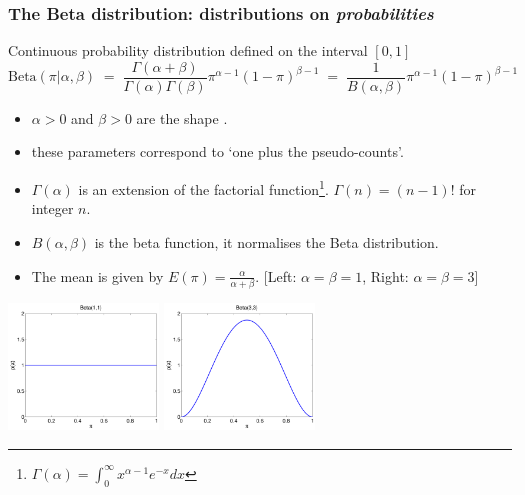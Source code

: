 \begin{frame}
\frametitle{The Beta distribution: distributions on \emph{probabilities}}

Continuous probability distribution defined on the interval
$[0,1]$
\[
\mathrm{Beta}(\pi|\alpha,\beta)\;=\;
\frac{\Gamma(\alpha+\beta)}{\Gamma(\alpha)\Gamma(\beta)}
\pi^{\alpha-1}(1-\pi)^{\beta-1}
\;=\;\frac{1}{B(\alpha,\beta)}\pi^{\alpha-1}(1-\pi)^{\beta-1}
\]
\vspace{-4mm}
\begin{itemize}
\item $\alpha>0$ and $\beta>0$ are the shape .
\item these parameters correspond to `one plus the pseudo-counts'.  
\item $\Gamma(\alpha)$ is an extension of the factorial function\footnote{$\Gamma(\alpha)
  =\int_0^\infty x^{\alpha-1} e^{-x} dx$}. 
$\Gamma(n)=(n-1)!$ for integer $n$.
\item $B(\alpha,\beta)$ is the beta function, it normalises the Beta distribution.
\item The mean is given by $E(\pi)=\frac{\alpha}{\alpha+\beta}$.\hfill
[Left: $\alpha=\beta=1$, Right:  $\alpha=\beta=3$]
\end{itemize}

\centerline{\includegraphics[width=0.3\textwidth]{Beta11}
\hspace{1cm}\includegraphics[width=0.3\textwidth]{Beta33}}
\end{frame}


